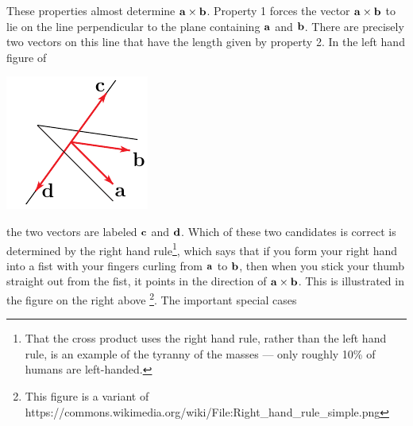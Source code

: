 \noindent
These properties almost determine $\mathbf{a}\times\mathbf{b}$. Property 1 forces
the vector $\mathbf{a}\times\mathbf{b}$ to lie on the line perpendicular to the
plane containing $\mathbf{a}$ and $\mathbf{b}$. There are precisely two vectors
on this line that have the length given by property 2. In the left hand
figure of
      \begin{efig} 
      \begin{center}
      \includegraphics{crossLL.pdf}\qquad\quad
      \qquad\quad
      \end{center}
      \end{efig}
the two vectors are labeled $\mathbf{c}$ and $\mathbf{d}$. Which of these two
candidates is correct is determined by the right hand rule\footnote{That 
the cross product uses the right hand rule, rather than the left hand rule, is an example of the tyranny of the masses --- only roughly 10\% 
of humans are left-handed. }, which says
that if you form your right hand into a fist with your fingers curling from 
$\mathbf{a}$ to $\mathbf{b}$, then when you stick your thumb straight out from
the fist, it points in the direction of $\mathbf{a}\times\mathbf{b}$. This is
illustrated in the figure on the right 
above
\footnote{This figure is a variant of 
https:/\hskip-1pt/commons.wikimedia.org/wiki/File:Right\_hand\_rule\_simple.png
}.
The important special cases

